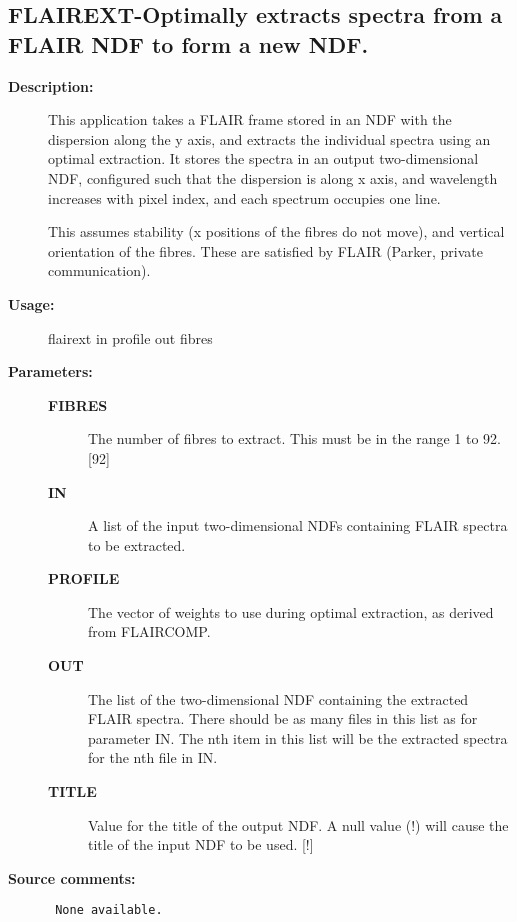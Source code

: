 \subsection{FLAIREXT-\label{FLAIREXT}Optimally extracts spectra from a FLAIR NDF to form a new NDF.}
\begin{description}

\item [{\bf Description:}]
 This application takes a FLAIR frame stored in an NDF with the
 dispersion along the y axis, and extracts the individual spectra
 using an optimal extraction.  It stores the spectra in an output
 two-dimensional NDF, configured such that the dispersion is along
 x axis, and wavelength increases with pixel index, and each
 spectrum occupies one line.

 This assumes stability (x positions of the fibres do not move),
 and vertical orientation of the fibres.  These are satisfied by
 FLAIR (Parker, private communication).

\item [{\bf Usage:}]
 flairext in profile out fibres

\item [{\bf Parameters:}]
\begin{description}
\item [{\bf FIBRES}]
 The number of fibres to extract.  This must be in the range
 1 to 92. [92]
\item [{\bf IN}]
 A list of the input two-dimensional NDFs containing FLAIR
 spectra to be extracted.
\item [{\bf PROFILE}]
 The vector of weights to use during optimal extraction, as
 derived from FLAIRCOMP.
\item [{\bf OUT}]
 The list of the two-dimensional NDF containing the extracted
 FLAIR spectra.  There should be as many files in this list as
 for parameter IN.  The nth item in this list will be the
 extracted spectra for the nth file in IN.
\item [{\bf TITLE}]
 Value for the title of the output NDF.  A null value (!) will
 cause the title of the input NDF to be used. [!]

\end{description}

\item [{\bf Source comments:}]
\begin{verbatim}
 None available.

\end{verbatim}
\end{description}
